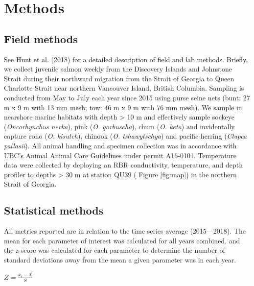 \documentclass[fleqn,10pt]{wlpeerj} %
\begin{document}
\section*{Methods}\label{methods}

\subsection*{Field methods}\label{field-methods}

See Hunt et al. (2018) for a detailed description of field and lab
methods. Briefly, we collect juvenile salmon weekly from the Discovery
Islands and Johnstone Strait during their northward migration from the
Strait of Georgia to Queen Charlotte Strait near northern Vancouver
Island, British Columbia. Sampling is conducted from May to July each
year since 2015 using purse seine nets (bunt: 27 m x 9 m with 13 mm
mesh; tow: 46 m x 9 m with 76 mm mesh). We sample in nearshore marine
habitats with depth \textgreater{} 10 m and effectively sample sockeye
(\emph{Oncorhynchus nerka}), pink (\emph{O. gorbuscha}), chum (\emph{O.
keta}) and invidentally capture coho (\emph{O. kisutch}), chinook
(\emph{O. tshawytschya}) and pacific herring (\emph{Clupea pallasii}).
All animal handling and specimen collection was in accordance with UBC's
Animal Animal Care Guidelines under permit A16-0101. Temperature data
were collected by deploying an RBR conductivity, temperature, and depth
profiler to depths \textgreater{} 30 m at station QU39 ( Figure
\ref{fig:map}) in the northern Strait of Georgia.

\subsection*{Statistical methods}\label{statistical-methods}

All metrics reported are in relation to the time series average
(2015---2018). The mean for each parameter of interest was calculated
for all years combined, and the z-score was calculated for each
parameter to determine the number of standard deviations away from the
mean a given parameter was in each year.

\(Z = {\frac{x_i - \bar X}{{S}}}\)
\end{document}
